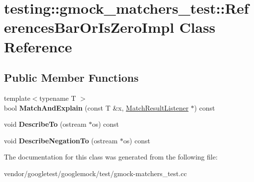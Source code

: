\hypertarget{classtesting_1_1gmock__matchers__test_1_1_references_bar_or_is_zero_impl}{}\section{testing\+:\+:gmock\+\_\+matchers\+\_\+test\+:\+:References\+Bar\+Or\+Is\+Zero\+Impl Class Reference}
\label{classtesting_1_1gmock__matchers__test_1_1_references_bar_or_is_zero_impl}
\subsection*{Public Member Functions}
\begin{DoxyCompactItemize}
\item 
\mbox{\label{classtesting_1_1gmock__matchers__test_1_1_references_bar_or_is_zero_impl_ac74ff2f707bebea05a995beb77c77041}} 
{\footnotesize template$<$typename T $>$ }\\bool {\bfseries Match\+And\+Explain} (const T \&x, \hyperlink{classtesting_1_1_match_result_listener}{Match\+Result\+Listener} $\ast$) const
\item 
\mbox{\label{classtesting_1_1gmock__matchers__test_1_1_references_bar_or_is_zero_impl_a8d8496ad72753723598efd45e6a4dcbf}} 
void {\bfseries Describe\+To} (ostream $\ast$os) const
\item 
\mbox{\label{classtesting_1_1gmock__matchers__test_1_1_references_bar_or_is_zero_impl_a849b65d96bf7a31b7b0e81005e466605}} 
void {\bfseries Describe\+Negation\+To} (ostream $\ast$os) const
\end{DoxyCompactItemize}


The documentation for this class was generated from the following file\+:\begin{DoxyCompactItemize}
\item 
vendor/googletest/googlemock/test/gmock-\/matchers\+\_\+test.\+cc\end{DoxyCompactItemize}
